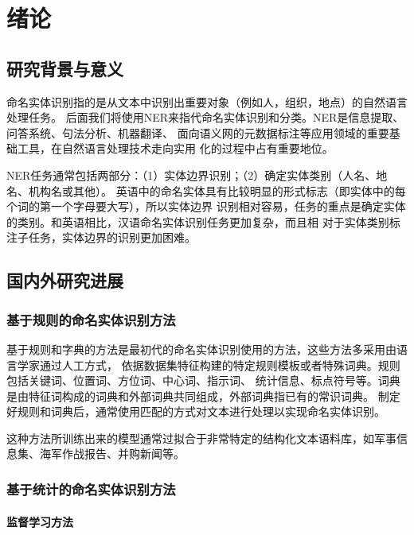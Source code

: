 
\chapter{绪论}


\section{研究背景与意义}

命名实体识别指的是从文本中识别出重要对象（例如人，组织，地点）的自然语言处理任务\parencite{erdogan2010sequence}。
后面我们将使用NER来指代命名实体识别和分类。NER是信息提取、问答系统、句法分析、机器翻译、
面向语义网的元数据标注等应用领域的重要基础工具，在自然语言处理技术走向实用
化的过程中占有重要地位。

NER任务通常包括两部分：（1）实体边界识别；（2）确定实体类别（人名、地名、机构名或其他）。
英语中的命名实体具有比较明显的形式标志（即实体中的每个词的第一个字母要大写），所以实体边界
识别相对容易，任务的重点是确定实体的类别。和英语相比，汉语命名实体识别任务更加复杂，而且相
对于实体类别标注子任务，实体边界的识别更加困难。


\section{国内外研究进展}


\subsection{基于规则的命名实体识别方法}

基于规则和字典的方法是最初代的命名实体识别使用的方法，这些方法多采用由语言学家通过人工方式，
依据数据集特征构建的特定规则模板或者特殊词典。规则包括关键词、位置词、方位词、中心词、指示词、
统计信息、标点符号等。词典是由特征词构成的词典和外部词典共同组成，外部词典指已有的常识词典。
制定好规则和词典后，通常使用匹配的方式对文本进行处理以实现命名实体识别。

这种方法所训练出来的模型通常过拟合于非常特定的结构化文本语料库，如军事信息集、海军作战报告、并购新闻等。


\subsection{基于统计的命名实体识别方法}

\subsubsection{监督学习方法}

